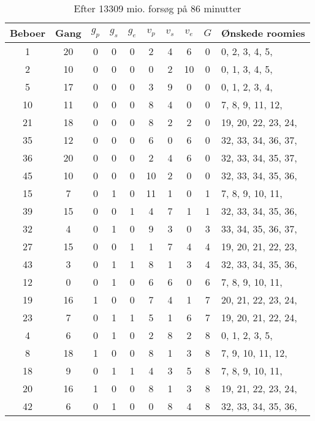 \documentclass[article,oneside,11pt,a4paper]{memoir}
\newenvironment{assignment}[1]{
\begin{table}[h]
\caption{#1}
\footnotesize
\begin{center}
\begin{tabular}{cccccccccl}
\toprule
Beboer & Gang & $g_p$ & $g_s$ & $g_e$ & $v_p$ & $v_s$ & $v_e$ & $G$ & Ønskede roomies \\ \midrule
}{
\bottomrule
\end{tabular}
\end{center}
\end{table}

}
\begin{document}
\begin{assignment}{Efter 13309 mio. forsøg på 86 minutter}
     1 &   20 &   0 &   0 &   0 &   2 &   4 &   6 &  0 &   0,  2,  3,  4,  5, \\
     2 &   10 &   0 &   0 &   0 &   0 &   2 &  10 &  0 &   0,  1,  3,  4,  5, \\
     5 &   17 &   0 &   0 &   0 &   3 &   9 &   0 &  0 &   0,  1,  2,  3,  4, \\
    10 &   11 &   0 &   0 &   0 &   8 &   4 &   0 &  0 &   7,  8,  9, 11, 12, \\
    21 &   18 &   0 &   0 &   0 &   8 &   2 &   2 &  0 &  19, 20, 22, 23, 24, \\
    35 &   12 &   0 &   0 &   0 &   6 &   0 &   6 &  0 &  32, 33, 34, 36, 37, \\
    36 &   20 &   0 &   0 &   0 &   2 &   4 &   6 &  0 &  32, 33, 34, 35, 37, \\
    45 &   10 &   0 &   0 &   0 &  10 &   2 &   0 &  0 &  32, 33, 34, 35, 36, \\
    15 &    7 &   0 &   1 &   0 &  11 &   1 &   0 &  1 &   7,  8,  9, 10, 11, \\
    39 &   15 &   0 &   0 &   1 &   4 &   7 &   1 &  1 &  32, 33, 34, 35, 36, \\
    32 &    4 &   0 &   1 &   0 &   9 &   3 &   0 &  3 &  33, 34, 35, 36, 37, \\
    27 &   15 &   0 &   0 &   1 &   1 &   7 &   4 &  4 &  19, 20, 21, 22, 23, \\
    43 &    3 &   0 &   1 &   1 &   8 &   1 &   3 &  4 &  32, 33, 34, 35, 36, \\
    12 &    0 &   0 &   1 &   0 &   6 &   6 &   0 &  6 &   7,  8,  9, 10, 11, \\
    19 &   16 &   1 &   0 &   0 &   7 &   4 &   1 &  7 &  20, 21, 22, 23, 24, \\
    23 &    7 &   0 &   1 &   1 &   5 &   1 &   6 &  7 &  19, 20, 21, 22, 24, \\
     4 &    6 &   0 &   1 &   0 &   2 &   8 &   2 &  8 &   0,  1,  2,  3,  5, \\
     8 &   18 &   1 &   0 &   0 &   8 &   1 &   3 &  8 &   7,  9, 10, 11, 12, \\
    18 &    9 &   0 &   1 &   1 &   4 &   3 &   5 &  8 &   7,  8,  9, 10, 11, \\
    20 &   16 &   1 &   0 &   0 &   8 &   1 &   3 &  8 &  19, 21, 22, 23, 24, \\
    42 &    6 &   0 &   1 &   0 &   0 &   8 &   4 &  8 &  32, 33, 34, 35, 36, \\

\end{assignment}
\end{document}
